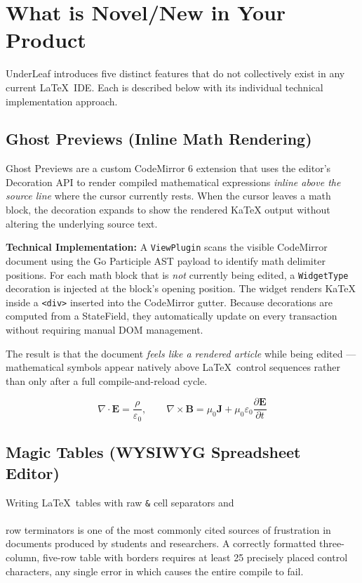 \documentclass[11pt, a4paper]{article}
\begin{document}
\section{What is Novel/New in Your Product}

UnderLeaf introduces five distinct features that do not collectively exist in any current \LaTeX\ IDE. Each is described below with its individual technical implementation approach.

\subsection{Ghost Previews (Inline Math Rendering)}

Ghost Previews are a custom CodeMirror 6 extension that uses the editor's Decoration API to render compiled mathematical expressions \emph{inline above the source line} where the cursor currently rests. When the cursor leaves a math block, the decoration expands to show the rendered KaTeX output without altering the underlying source text.

\textbf{Technical Implementation:} A \texttt{ViewPlugin} scans the visible CodeMirror document using the Go Participle AST payload to identify math delimiter positions. For each math block that is \emph{not} currently being edited, a \texttt{WidgetType} decoration is injected at the block's opening position. The widget renders KaTeX inside a \texttt{<div>} inserted into the CodeMirror gutter. Because decorations are computed from a StateField, they automatically update on every transaction without requiring manual DOM management.

The result is that the document \emph{feels like a rendered article} while being edited — mathematical symbols appear natively above \LaTeX\ control sequences rather than only after a full compile-and-reload cycle.

$$ \nabla \cdot \mathbf{E} = \frac{\rho}{\varepsilon_0}, \qquad \nabla \times \mathbf{B} = \mu_0 \mathbf{J} + \mu_0 \varepsilon_0 \frac{\partial \mathbf{E}}{\partial t} $$

\subsection{Magic Tables (WYSIWYG Spreadsheet Editor)}

Writing \LaTeX\ tables with raw \texttt{\&} cell separators and \texttt{\\\\} row terminators is one of the most commonly cited sources of frustration in documents produced by students and researchers. A correctly formatted three-column, five-row table with borders requires at least 25 precisely placed control characters, any single error in which causes the entire compile to fail.
\end{document}
